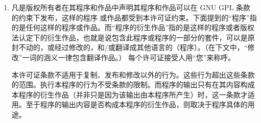 \begin{enumerate}
    \addtocounter{enumi}{-1}

    
    \item 凡是版权所有者在其程序和作品中声明其程序和作品可以在 GNU GPL 条款的约束下发布，这样的程序 或作品都受到本许可证约束。下面提到的``程序''指的是任何这样的程序或作品。而``程序的衍生作品''指的是这样的程序或者版权法认定下的衍生作品，也就是说包含此程序或程序的一部分的套件，可以是原封不动的，或经过修改的，和/或翻译成其他语言的（程序）。（在下文中，``修改''一词的涵义一律包含翻译作品。） 每个许可证接受人用``您''来称呼。

        本许可证条款不适用于复制、发布和修改以外的行为。这些行为超出这些条款的范围。执行本程序的行为不受条款的限制。而程序的输出只有在其内容构成本程序的衍生作品（并非只是因为该输出由本程序所产生）时，这一条款才适用。至于程序的输出内容是否构成本程序的衍生作品，则取决于程序具体的用途。



\end{enumerate}
